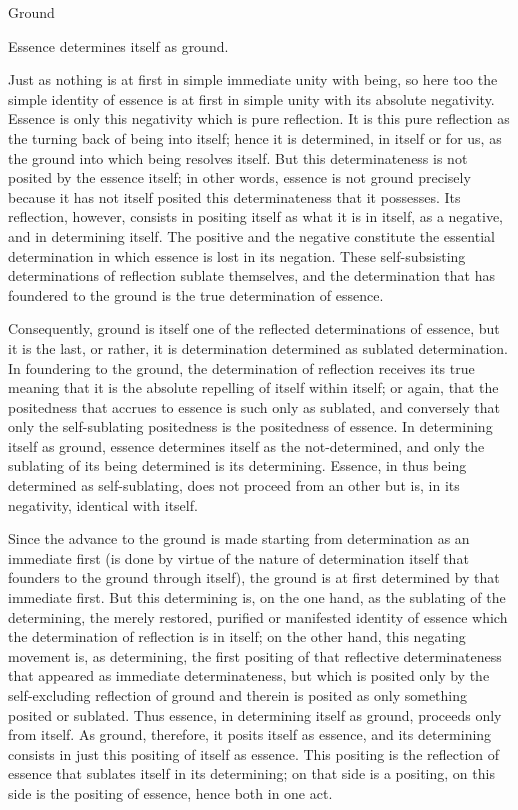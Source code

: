 Ground

Essence determines itself as ground.

Just as nothing is at first
in simple immediate unity with being,
so here too the simple identity of essence is
at first in simple unity with its absolute negativity.
Essence is only this negativity which is pure reflection.
It is this pure reflection as
the turning back of being into itself;
hence it is determined, in itself or for us,
as the ground into which being resolves itself.
But this determinateness is not posited by the essence itself;
in other words, essence is not ground precisely because
it has not itself posited this determinateness that it possesses.
Its reflection, however, consists in positing itself as
what it is in itself, as a negative, and in determining itself.
The positive and the negative constitute the essential determination
in which essence is lost in its negation.
These self-subsisting determinations of reflection sublate themselves,
and the determination that has foundered to the ground is
the true determination of essence.

Consequently, ground is itself one of
the reflected determinations of essence,
but it is the last, or rather,
it is determination determined as sublated determination.
In foundering to the ground, the determination of reflection
receives its true meaning that it is the absolute
repelling of itself within itself;
or again, that the positedness that accrues to essence is
such only as sublated,
and conversely that only the self-sublating positedness is
the positedness of essence.
In determining itself as ground,
essence determines itself as the not-determined,
and only the sublating of its being determined is its determining.
Essence, in thus being determined as self-sublating,
does not proceed from an other but is,
in its negativity, identical with itself.

Since the advance to the ground is made starting
from determination as an immediate first
(is done by virtue of the nature of determination itself
that founders to the ground through itself),
the ground is at first determined by that immediate first.
But this determining is, on the one hand,
as the sublating of the determining,
the merely restored, purified or manifested identity of essence
which the determination of reflection is in itself;
on the other hand, this negating movement is, as determining,
the first positing of that reflective determinateness
that appeared as immediate determinateness,
but which is posited only by the self-excluding reflection of ground
and therein is posited as only something posited or sublated.
Thus essence, in determining itself as ground, proceeds only from itself.
As ground, therefore, it posits itself as essence,
and its determining consists in just this positing of itself as essence.
This positing is the reflection of essence
that sublates itself in its determining;
on that side is a positing, on this side is the positing of essence,
hence both in one act.

